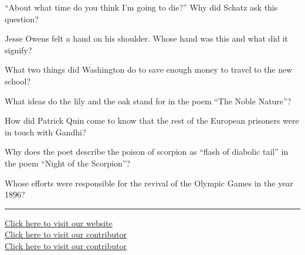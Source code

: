 \documentclass[11pt,a4paper]{article}
\begin{document}
\begin{parts}
  \item ``About what time do you think I'm going to die?'' Why did Schatz ask this question?
  \item Jesse Owens felt a hand on his shoulder. Whose hand was this and what did it signify?
  \item What two things did Washington do to save enough money to travel to the new school?
  \item What ideas do the lily and the oak stand for in the poem ``The Noble Nature''?
  \item How did Patrick Quin come to know that the rest of the European prisoners were in touch with Gandhi?
  \item Why does the poet describe the poison of scorpion as ``flash of diabolic tail'' in the poem ``Night of the Scorpion''?
  \item Whose efforts were responsible for the revival of the Olympic Games in the year 1896?
\end{parts}

\vfill
\rule{\linewidth}{0.4pt}

\begin{center}\small
\href{https://bhu-exam.vercel.app/}{Click here to visit our website}\\[4pt]
\href{https://me-aryan.vercel.app/}{Click here to visit our contributor}\\[4pt]
\href{https://quashan-me.vercel.app/}{Click here to visit our contributor}
\end{center}
\end{document}
